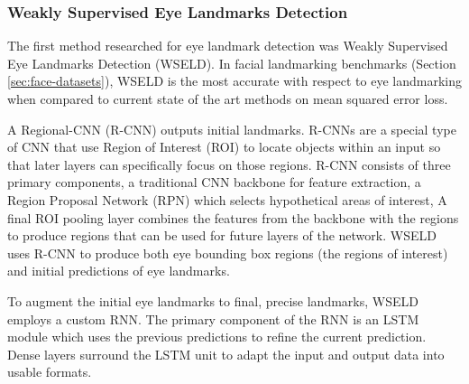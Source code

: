 \subsubsection{Weakly Supervised Eye Landmarks Detection}


The first method researched for eye landmark detection was Weakly Supervised Eye Landmarks Detection (WSELD)\cite{huang2020eye}. In facial landmarking benchmarks (Section \ref{sec:face-datasets}), WSELD is the most accurate with respect to eye landmarking when compared to current state of the art methods on mean squared error loss.

A Regional-CNN (R-CNN)\cite{ren2015faster} outputs initial landmarks. R-CNNs are a special type of CNN that use Region of Interest (ROI) to locate objects within an input so that later layers can specifically focus on those regions. R-CNN consists of three primary components, a traditional CNN backbone for feature extraction, a Region Proposal Network (RPN) which selects hypothetical areas of interest, A final ROI pooling layer combines the features from the backbone with the regions to produce regions that can be used for future layers of the network. WSELD uses R-CNN to produce both eye bounding box regions (the regions of interest) and initial predictions of eye landmarks.

To augment the initial eye landmarks to final, precise landmarks, WSELD employs a custom RNN. The primary component of the RNN is an LSTM module which uses the previous predictions to refine the current prediction. Dense layers surround the LSTM unit to adapt the input and output data into usable formats.

